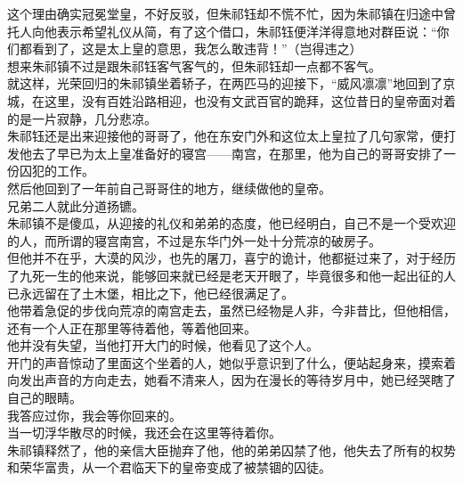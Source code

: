 \begin{multicols}{\theparacolNo}
这个理由确实冠冕堂皇，不好反驳，但朱祁钰却不慌不忙，因为朱祁镇在归途中曾托人向他表示希望礼仪从简，有了这个借口，朱祁钰便洋洋得意地对群臣说：“你们都看到了，这是太上皇的意思，我怎么敢违背！”（岂得违之）\\

想来朱祁镇不过是跟朱祁钰客气客气的，但朱祁钰却一点都不客气。\\

就这样，光荣回归的朱祁镇坐着轿子，在两匹马的迎接下，“威风凛凛”地回到了京城，在这里，没有百姓沿路相迎，也没有文武百官的跪拜，这位昔日的皇帝面对着的是一片寂静，几分悲凉。\\

朱祁钰还是出来迎接他的哥哥了，他在东安门外和这位太上皇拉了几句家常，便打发他去了早已为太上皇准备好的寝宫——南宫，在那里，他为自己的哥哥安排了一份囚犯的工作。\\

然后他回到了一年前自己哥哥住的地方，继续做他的皇帝。\\

兄弟二人就此分道扬镳。\\

朱祁镇不是傻瓜，从迎接的礼仪和弟弟的态度，他已经明白，自己不是一个受欢迎的人，而所谓的寝宫南宫，不过是东华门外一处十分荒凉的破房子。\\

但他并不在乎，大漠的风沙，也先的屠刀，喜宁的诡计，他都挺过来了，对于经历了九死一生的他来说，能够回来就已经是老天开眼了，毕竟很多和他一起出征的人已永远留在了土木堡，相比之下，他已经很满足了。\\

他带着急促的步伐向荒凉的南宫走去，虽然已经物是人非，今非昔比，但他相信，还有一个人正在那里等待着他，等着他回来。\\

他并没有失望，当他打开大门的时候，他看见了这个人。\\

开门的声音惊动了里面这个坐着的人，她似乎意识到了什么，便站起身来，摸索着向发出声音的方向走去，她看不清来人，因为在漫长的等待岁月中，她已经哭瞎了自己的眼睛。\\

我答应过你，我会等你回来的。\\

当一切浮华散尽的时候，我还会在这里等待着你。\\

朱祁镇释然了，他的亲信大臣抛弃了他，他的弟弟囚禁了他，他失去了所有的权势和荣华富贵，从一个君临天下的皇帝变成了被禁锢的囚徒。\\


\end{multicols}
